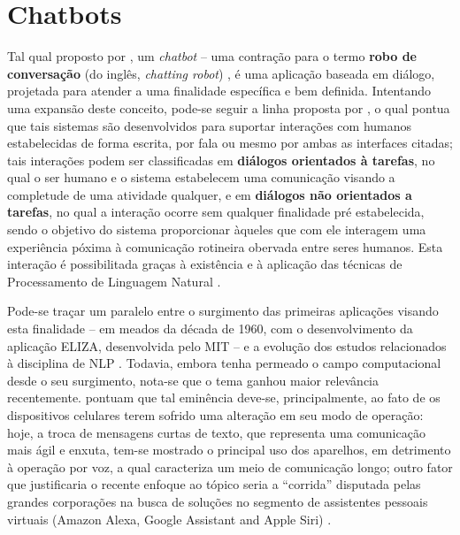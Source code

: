 \section{Chatbots}
\label{sec:chatbots}

Tal qual proposto por , um \textit{chatbot} -- uma contração para o termo \textbf{robo de conversação} (do inglês, \textit{chatting robot}) \cite{lokman2018modern}, é uma aplicação baseada em diálogo, projetada para atender a uma finalidade específica e bem definida. Intentando uma expansão deste conceito, pode-se seguir a linha proposta por , o qual pontua que tais sistemas são desenvolvidos para suportar interações com humanos estabelecidas de forma escrita, por fala ou mesmo por ambas as interfaces citadas; tais interações podem ser classificadas em \textbf{diálogos orientados à tarefas}, no qual o ser humano e o sistema estabelecem uma comunicação visando a completude de uma atividade qualquer, e em \textbf{diálogos não orientados a tarefas}, no qual a interação ocorre sem qualquer finalidade pré estabelecida, sendo o objetivo do sistema proporcionar àqueles que com ele interagem uma experiência póxima à comunicação rotineira obervada entre seres humanos. Esta interação é possibilitada graças à existência e à aplicação das técnicas de Processamento de Linguagem Natural \cite{lokman2018modern}.

Pode-se traçar um paralelo entre o surgimento das primeiras aplicações visando esta finalidade -- em meados da década de 1960, com o desenvolvimento da aplicação ELIZA, desenvolvida pelo MIT -- e a evolução dos estudos relacionados à disciplina de NLP \cite{lokman2018modern,allen1988natural}. Todavia, embora tenha permeado o campo computacional desde o seu surgimento, nota-se que o tema ganhou maior relevância recentemente.  pontuam que tal eminência deve-se, principalmente, ao fato de os dispositivos celulares terem sofrido uma alteração em seu modo de operação: hoje, a troca de mensagens curtas de texto, que representa uma comunicação mais ágil e enxuta, tem-se mostrado o principal uso dos aparelhos, em detrimento à operação por voz, a qual caracteriza um meio de comunicação longo; outro fator que justificaria o recente enfoque ao tópico seria a ``corrida''  disputada pelas grandes corporações na busca de soluções no segmento de assistentes pessoais virtuais (Amazon Alexa, Google Assistant and Apple Siri) \cite{lokman2018modern}.